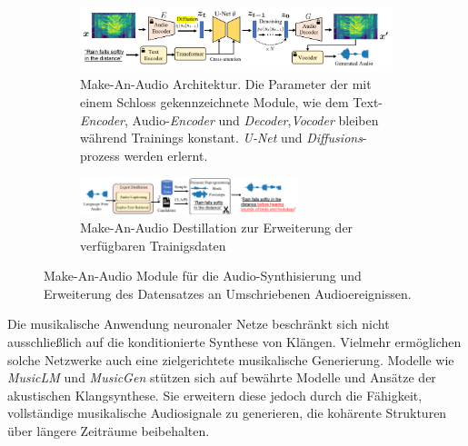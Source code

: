 \documentclass[
  a4paper,  %
  twoside,  %
  bibliography=totoc,
  headsepline,
  cleardoublepage=empty,
  parskip=half,
  draft=false
]{scrbook}
\begin{document}
\begin{figure}[h]
\centering
\begin{subfigure}{1.0\textwidth}
  \centering
  \includegraphics[width=1\textwidth]{graphics/Make-An_Audio.png}
  \caption[Make-An-Audio Architektur]{Make-An-Audio Architektur. Die Parameter der mit einem Schloss gekennzeichnete Module, wie dem Text-\emph{Encoder}, Audio-\emph{Encoder} und \emph{Decoder},\emph{Vocoder} bleiben während Trainings konstant. \emph{U-Net} und \emph{Diffusions}-prozess werden erlernt. \cite{huang_make--audio_2023}\cite{huang_make--audio_2023}}
  \label{fig:Make-An-Audio_Architecture}
\end{subfigure}

\vspace{1em} %

\begin{subfigure}{1.0\textwidth}
  \centering
  \includegraphics[width=0.7\textwidth]{graphics/Make-An-Audio-Destillation.png}
  \caption[Make-An-Audio Destillation]{Make-An-Audio Destillation zur Erweiterung der verfügbaren Trainigsdaten \cite{huang_make--audio_2023}}
  \label{fig:Make-An-Audio_DestillATIon}
\end{subfigure}
\caption[Make-An-Audio Module]{Make-An-Audio Module für die Audio-Synthisierung und Erweiterung des Datensatzes an Umschriebenen Audioereignissen. \cite{huang_make--audio_2023}}
\label{fig:test}
\end{figure}

Die musikalische Anwendung neuronaler Netze beschränkt sich nicht ausschließlich auf die konditionierte Synthese von Klängen. Vielmehr ermöglichen solche Netzwerke auch eine zielgerichtete musikalische Generierung. Modelle wie \emph{MusicLM} \cite{agostinelli_musiclm_2023} und \emph{MusicGen} \cite{copet_simple_2023} stützen sich auf bewährte Modelle und Ansätze der akustischen Klangsynthese. Sie erweitern diese jedoch durch die Fähigkeit, vollständige musikalische Audiosignale zu generieren, die kohärente Strukturen über längere Zeiträume beibehalten. 
\end{document}
